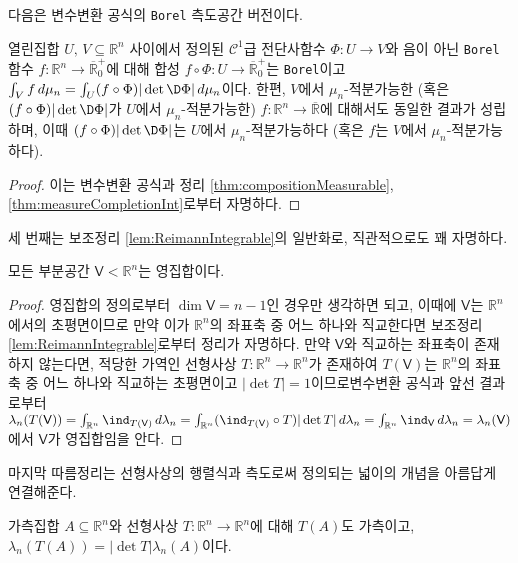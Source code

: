 다음은 변수변환 공식의 \texttt{Borel} 측도공간 버전이다.

\begin{corollary}
    열린집합 $U,\,V\subseteq\mathbb{R}^n$ 사이에서 정의된 $\mathcal{C}^1$급 전단사함수 $\Phi:U\to V$와 음이 아닌 \texttt{Borel} 함수 $f:\mathbb{R}^n\to\overline{\mathbb{R}}^+_0$에 대해 합성 $f\circ\Phi:U\to\overline{\mathbb{R}}^+_0$는 \texttt{Borel}이고 $\int_V f\,d\mu_n=\int_U(f\circ\Phi)|\det\D\Phi|\,d\mu_n$이다. 한편, $V$에서 $\mu_n$-적분가능한 (혹은 $(f\circ\Phi)|\det\D\Phi|$가 $U$에서 $\mu_n$-적분가능한) $f:\mathbb{R}^n\to\overline{\mathbb{R}}$에 대해서도 동일한 결과가 성립하며, 이때 $(f\circ\Phi)|\det\D\Phi|$는 $U$에서 $\mu_n$-적분가능하다 (혹은 $f$는 $V$에서 $\mu_n$-적분가능하다).
\end{corollary}

\begin{proof}
    이는 변수변환 공식과 정리 \ref{thm:compositionMeasurable}, \ref{thm:measureCompletionInt}로부터 자명하다.
\end{proof}

세 번째는 보조정리 \ref{lem:ReimannIntegrable}의 일반화로, 직관적으로도 꽤 자명하다.

\begin{corollary}\label{cor:subspaceNull}
    모든 부분공간 $\mathsf{V}<\mathbb{R}^n$는 영집합이다.
\end{corollary}

\begin{proof}
    영집합의 정의로부터 $\dim\mathsf{V}=n-1$인 경우만 생각하면 되고, 이때에 $\mathsf{V}$는 $\mathbb{R}^n$에서의 초평면이므로 만약 이가 $\mathbb{R}^n$의 좌표축 중 어느 하나와 직교한다면 보조정리 \ref{lem:ReimannIntegrable}로부터 정리가 자명하다. 만약 $\mathsf{V}$와 직교하는 좌표축이 존재하지 않는다면, 적당한 가역인 선형사상 $T:\mathbb{R}^n\to\mathbb{R}^n$가 존재하여 $T(\mathsf{V})$는 $\mathbb{R}^n$의 좌표축 중 어느 하나와 직교하는 초평면이고 $|\det T|=1$이므로\footnotemark 변수변환 공식과 앞선 결과로부터 $\lambda_n(T(\mathsf{V}))=\int_{\mathbb{R}^n}\ind_{T(\mathsf{V})}\,d\lambda_n=\int_{\mathbb{R}^n}(\ind_{T(\mathsf{V})}\circ T)|\det T|\,d\lambda_n=\int_{\mathbb{R}^n}\ind_{\mathsf{V}}\,d\lambda_n=\lambda_n(\mathsf{V})$에서 $\mathsf{V}$가 영집합임을 안다.
\end{proof}

마지막 따름정리는 선형사상의 행렬식과 측도로써 정의되는 넓이의 개념을 아름답게 연결해준다.

\begin{corollary}
    가측집합 $A\subseteq\mathbb{R}^n$와 선형사상 $T:\mathbb{R}^n\to\mathbb{R}^n$에 대해 $T(A)$도 가측이고, $\lambda_n(T(A))=|\det T|\lambda_n(A)$이다.
\end{corollary}

